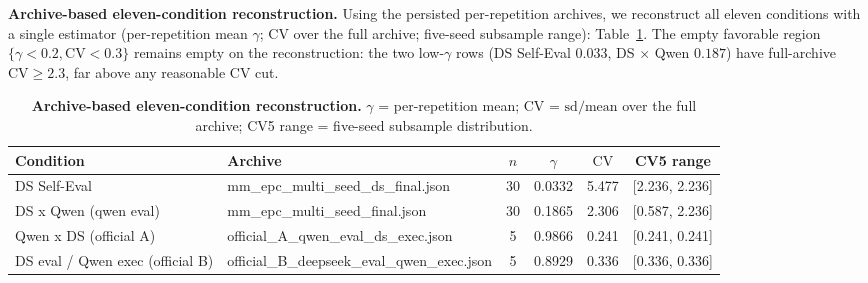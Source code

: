 \documentclass[11pt]{article}
\begin{document}
\noindent\textbf{Archive-based eleven-condition reconstruction.} Using the persisted per-repetition archives, we reconstruct all eleven conditions with a single estimator (per-repetition mean $\gamma$; $\mathrm{CV}$ over the full archive; five-seed subsample range): Table~\ref{tab:recon}. The empty favorable region $\{\gamma < 0.2, \mathrm{CV} < 0.3\}$ remains empty on the reconstruction: the two low-$\gamma$ rows (DS Self-Eval $0.033$, DS $\times$ Qwen $0.187$) have full-archive $\mathrm{CV} \geq 2.3$, far above any reasonable $\mathrm{CV}$ cut.

\begin{table}[t]
\centering
\caption{\textbf{Archive-based eleven-condition reconstruction.} $\gamma$ = per-repetition mean; $\mathrm{CV}$ = $\mathrm{sd}/\mathrm{mean}$ over the full archive; CV5 range = five-seed subsample distribution.}
\label{tab:recon}
\small
\setlength{\tabcolsep}{2pt}
\begin{tabular}{@{}lp{}cccc@{}}
\toprule
Condition & Archive & $n$ & $\gamma$ & $\mathrm{CV}$ & CV5 range \\
\midrule
    DS Self-Eval & mm\_\hspace{0pt}epc\_\hspace{0pt}multi\_\hspace{0pt}seed\_\hspace{0pt}ds\_\hspace{0pt}final.json & 30 & 0.0332 & 5.477 & [2.236, 2.236] \\
    DS x Qwen (qwen eval) & mm\_\hspace{0pt}epc\_\hspace{0pt}multi\_\hspace{0pt}seed\_\hspace{0pt}final.json & 30 & 0.1865 & 2.306 & [0.587, 2.236] \\
    Qwen x DS (official A) & official\_\hspace{0pt}A\_\hspace{0pt}qwen\_\hspace{0pt}eval\_\hspace{0pt}ds\_\hspace{0pt}exec.json & 5 & 0.9866 & 0.241 & [0.241, 0.241] \\
    DS eval / Qwen exec (official B) & official\_\hspace{0pt}B\_\hspace{0pt}deepseek\_\hspace{0pt}eval\_\hspace{0pt}qwen\_\hspace{0pt}exec.json & 5 & 0.8929 & 0.336 & [0.336, 0.336] \\

\end{tabular}
\end{table}
\end{document}
